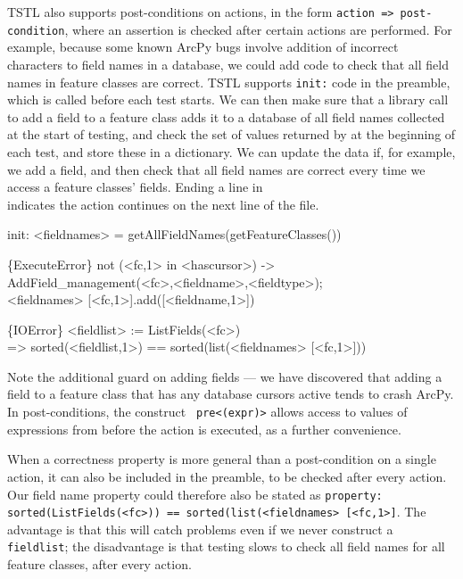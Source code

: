 TSTL also supports post-conditions on actions, in the form {\tt action
  => post-condition}, where an assertion is
checked after certain actions are performed.  For example, because
some known ArcPy bugs involve addition of incorrect characters to
field names in a database, we could add code to check that all field
names in feature classes are correct.  TSTL supports {\tt init:} code
in the preamble, which is called before each test starts.  We can then
make sure that a library call to add a field to a feature class adds
it to a database of all field names collected at the start of testing,
and check the set of values returned by 
at the beginning of each test, and store these in a dictionary.  We
can update the data if, for example, we add a field, and then check
that all field names are correct every time we access a feature
classes' fields.  Ending a line in {\tt \\} indicates the action
continues on the next line of the file.

{\scriptsize
\begin{code}
init: <fieldnames> = getAllFieldNames(getFeatureClasses())

\{ExecuteError\} not (<fc,1> in <hascursor>) -> \\
   AddField\_management(<fc>,<fieldname>,<fieldtype>); \\
   <fieldnames> [<fc,1>].add([<fieldname,1>])

\{IOError\} <fieldlist> := ListFields(<fc>) \\
  => sorted(<fieldlist,1>) == sorted(list(<fieldnames> [<fc,1>]))
\end{code}
}

Note the additional guard on adding fields --- we have discovered that
adding a field to a feature class that has any database cursors active
tends to crash ArcPy.  In post-conditions, the construct {\tt
  pre<(expr)>} allows access to values of expressions from before the
action is executed, as a further convenience.

When a correctness property is more general than a post-condition on a
single action, it can also be included in the preamble, to be checked
after every action.  Our field name property could therefore also be
stated as {\tt property: sorted(ListFields(<fc>)) ==
  sorted(list(<fieldnames> [<fc,1>]}.  The advantage is that this will
catch problems even if we never construct a {\tt fieldlist}; the
disadvantage is that testing slows to check all field names for all
feature classes, after every action.